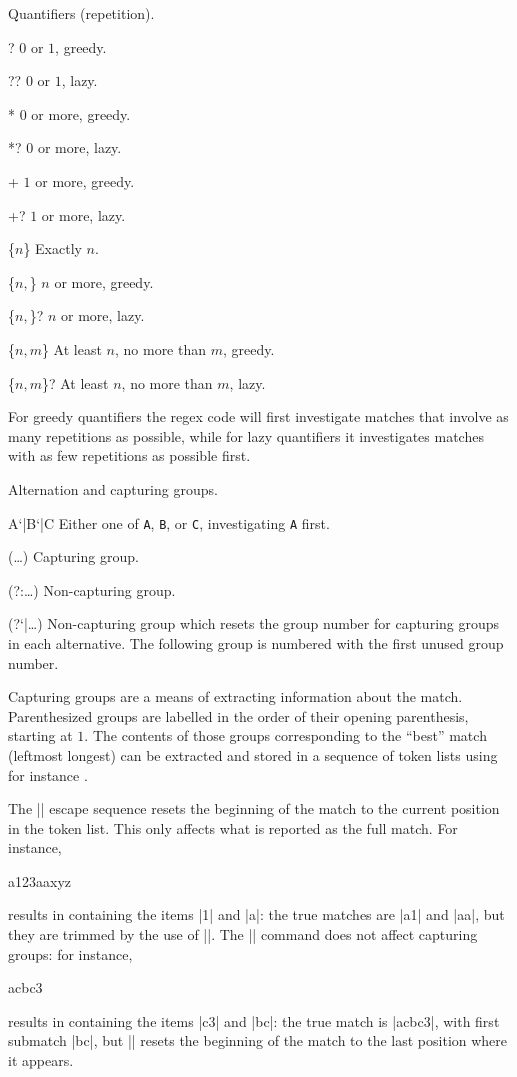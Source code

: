 \documentclass[oneside]{book}
\newenvironment{l3regex-syntax}
  {\begin{itemize}\def\\{\char`\\}\def\makelabel##1{\hss\llap{\ttfamily##1}}}
  {\end{itemize}}
\begin{document}
Quantifiers (repetition).
\begin{l3regex-syntax}
  \item[?] $0$ or $1$, greedy.
  \item[??] $0$ or $1$, lazy.
  \item[*] $0$ or more, greedy.
  \item[*?] $0$ or more, lazy.
  \item[+] $1$ or more, greedy.
  \item[+?] $1$ or more, lazy.
  \item[\{$n$\}] Exactly $n$.
  \item[\{$n,$\}] $n$ or more, greedy.
  \item[\{$n,$\}?] $n$ or more, lazy.
  \item[\{$n,m$\}] At least $n$, no more than $m$, greedy.
  \item[\{$n,m$\}?] At least $n$, no more than $m$, lazy.
\end{l3regex-syntax}
For greedy quantifiers the regex code will first investigate matches
that involve as many repetitions as possible, while for lazy
quantifiers it investigates matches with as few repetitions as
possible first.

Alternation and capturing groups.
\begin{l3regex-syntax}
  \item[A\char`|B\char`|C] Either one of \texttt{A}, \texttt{B},
    or \texttt{C}, investigating \texttt{A} first.
  \item[(\ldots{})] Capturing group.
  \item[(?:\ldots{})] Non-capturing group.
  \item[(?\char`|\ldots{})] Non-capturing group which resets
    the group number for capturing groups in each alternative.
    The following group is numbered with the first unused
    group number.
\end{l3regex-syntax}

Capturing groups are a means of extracting information about the
match. Parenthesized groups are labelled in the order of their
opening parenthesis, starting at $1$. The contents of those groups
corresponding to the \enquote{best} match (leftmost longest)
can be extracted and stored in a sequence of token lists using for
instance .

The |\K| escape sequence resets the beginning of the match to the
current position in the token list. This only affects what is reported
as the full match. For instance,
\begin{codehigh}
 {a123aaxyz} \lFooSeq
\end{codehigh}
results in  containing the items |{1}| and |{a}|: the
true matches are |{a1}| and |{aa}|, but they are trimmed by the use of
|\K|. The |\K| command does not affect capturing groups: for instance,
\begin{codehigh}
 {acbc3} \lFooSeq
\end{codehigh}
results in  containing the items |{c3}| and |{bc}|: the
true match is |{acbc3}|, with first submatch |{bc}|, but |\K| resets
the beginning of the match to the last position where it appears.
\end{document}
